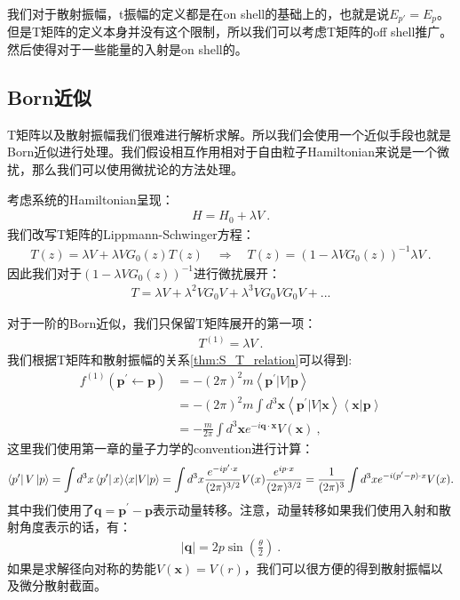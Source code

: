 \bigskip
{}

我们对于散射振幅，t振幅的定义都是在on shell的基础上的，也就是说$ E_{p'}=E_p
$。但是T矩阵的定义本身并没有这个限制，所以我们可以考虑T矩阵的off shell推广。然后使得对于一些能量的入射是on shell的。

\subsection{Born近似}

T矩阵以及散射振幅我们很难进行解析求解。所以我们会使用一个近似手段也就是Born近似进行处理。我们假设相互作用相对于自由粒子Hamiltonian来说是一个微扰，那么我们可以使用微扰论的方法处理。

\bigskip
{}

考虑系统的Hamiltonian呈现：
\begin{align}
  H=H_0+\lambda V\mathrm{~.}
\end{align}
我们改写T矩阵的Lippmann-Schwinger方程：
\begin{align}
  T(z)=\lambda V+\lambda VG_0(z)T(z)\quad \Rightarrow \quad
  T(z)=(1-\lambda V G_0(z))^{-1}\lambda V\mathrm{~.}
\end{align}
因此我们对于$ (1- \lambda V G_0(z))^{-1} $进行微扰展开：
\begin{align}
  T=\lambda V+\lambda^2VG_0V+\lambda^3VG_0VG_0V+...
\end{align}

\bigskip
{}

对于一阶的Born近似，我们只保留T矩阵展开的第一项：
\begin{align}
  T^{(1)}=\lambda V\mathrm{~.}
\end{align}
我们根据T矩阵和散射振幅的关系\cref{thm:S_T_relation}可以得到:
\begin{align}
  f^{(1)}(\mathbf{p^{\prime}\leftarrow
  p})&=-(2\pi)^2m\left\langle\mathbf{p}^{\prime}|V|\mathbf{p}\right\rangle\\
  &=-(2\pi)^2m\int
  d^3\mathbf{x}\left\langle\mathbf{p}^{\prime}|V|\mathbf{x}\right\rangle\left\langle\mathbf{x}|\mathbf{p}\right\rangle\\
  &=-\frac{m}{2\pi}\int
  d^3\mathbf{x}e^{-i\mathbf{q}\cdot\mathbf{x}}V(\mathbf{x})\mathrm{~,}
\end{align}
这里我们使用第一章的量子力学的convention进行计算：
\begin{align}\label{eq:plane_wave_convention}
  \bra{p'} V \ket{p} = \int d^3x \bra{p'} x \rangle \langle x | V | p
  \rangle = \int d^3x \frac{e^{-i p' \cdot x}}{(2\pi)^{3/2}} V(x)
  \frac{e^{i p \cdot x}}{(2\pi)^{3/2}} = \frac{1}{(2\pi)^3} \int d^3x
  e^{-i (p' - p) \cdot x} V(x).
\end{align}
其中我们使用了$ \mathbf{q}=\mathbf{p}^{\prime}-\mathbf{p}
$表示动量转移。注意，动量转移如果我们使用入射和散射角度表示的话，有：
\begin{align}
  |\mathbf{q}|=2p\sin\left(\frac{\theta}{2}\right)\mathrm{~.}
\end{align}
如果是求解径向对称的势能$ V(\mathbf{x})=V(r) $，我们可以很方便的得到散射振幅以及微分散射截面。

